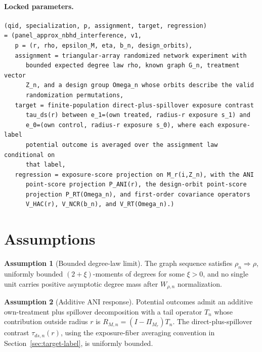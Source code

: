 \documentclass[11pt]{article}
\theoremstyle{definition}
\newtheorem{assumption}{Assumption}
\theoremstyle{plain}
\theoremstyle{remark}
\begin{document}
\paragraph{Locked parameters.}
\begin{verbatim}
(qid, specialization, p, assignment, target, regression)
= (panel_approx_nbhd_interference, v1,
   p = (r, rho, epsilon_M, eta, b_n, design_orbits),
   assignment = triangular-array randomized network experiment with
      bounded expected degree law rho, known graph G_n, treatment vector
      Z_n, and a design group Omega_n whose orbits describe the valid
      randomization permutations,
   target = finite-population direct-plus-spillover exposure contrast
      tau_ds(r) between e_1=(own treated, radius-r exposure s_1) and
      e_0=(own control, radius-r exposure s_0), where each exposure-label
      potential outcome is averaged over the assignment law conditional on
      that label,
   regression = exposure-score projection on M_r(i,Z_n), with the ANI
      point-score projection P_ANI(r), the design-orbit point-score
      projection P_RT(Omega_n), and first-order covariance operators
      V_HAC(r), V_NCR(b_n), and V_RT(Omega_n).)
\end{verbatim}

\section{Assumptions}
\begin{assumption}[Bounded degree-law limit]\label{ass:degree-law}
The graph sequence satisfies \(\rho_n\Rightarrow\rho\), uniformly bounded
\((2+\xi)\)-moments of degrees for some \(\xi>0\), and no single unit carries
positive asymptotic degree mass after \(W_{\rho,n}\) normalization.
\end{assumption}

\begin{assumption}[Additive ANI response]\label{ass:additive-ani}
Potential outcomes admit an additive own-treatment plus spillover
decomposition with a tail operator \(T_n\) whose contribution outside radius
\(r\) is \(R_{M,n}=(I-\Pi_{M_r})T_n\).  The direct-plus-spillover contrast
\(\tau_{ds,n}(r)\), using the exposure-fiber averaging convention in
Section~\ref{sec:target-label}, is uniformly bounded.
\end{assumption}
\end{document}
